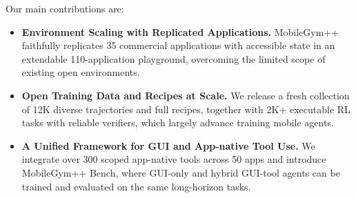 
Our main contributions are:
\begin{itemize}[leftmargin=2em, itemsep=2pt, topsep=0pt, parsep=0pt]
\item \textbf{Environment Scaling with Replicated Applications.}  MobileGym++ faithfully replicates 35 commercial applications with accessible state in an extendable 110-application playground, overcoming the limited scope of existing open environments.
\item \textbf{Open Training Data and Recipes at Scale.}
We release a fresh collection of 12K diverse trajectories and full recipes, together with 2K+ executable RL tasks with reliable verifiers, which largely advance training mobile agents.
\item \textbf{A Unified Framework for GUI and App-native Tool Use.} We integrate over 300 scoped app-native tools across 50 apps and introduce MobileGym++ Bench, where GUI-only and hybrid GUI-tool agents can be trained and evaluated on the same long-horizon tasks. 
\end{itemize}